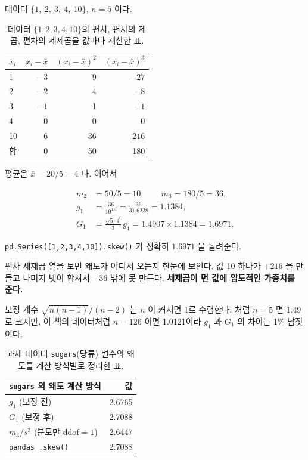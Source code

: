 \begin{example}
\label{ex:skew-by-hand}
데이터 $\{1,\ 2,\ 3,\ 4,\ 10\}$, $n = 5$ 이다.

\begin{table}[H]\centering
\caption{데이터 $\{1,2,3,4,10\}$의 편차, 편차의 제곱, 편차의 세제곱을
값마다 계산한 표.}
\label{tab:desc-skew-by-hand}
\begin{tabular}{lrrr}
\toprule
$x_i$ & $x_i - \bar{x}$ & $(x_i-\bar{x})^2$ & $(x_i-\bar{x})^3$ \\
\midrule
1  & $-3$ & 9  & $-27$ \\
\midrule
2  & $-2$ & 4  & $-8$  \\
\midrule
3  & $-1$ & 1  & $-1$  \\
\midrule
4  & $0$  & 0  & $0$   \\
\midrule
10 & $6$  & 36 & $216$ \\
\midrule
합 & $0$ & 50 & 180 \\
\bottomrule
\end{tabular}
\end{table}

평균은 $\bar{x} = 20/5 = 4$ 다. 이어서

\begin{align*}
  m_2 &= 50/5 = 10, \qquad m_3 = 180/5 = 36, \\
  g_1 &= \frac{36}{10^{1.5}} = \frac{36}{31.6228} = 1.1384, \\
  G_1 &= \frac{\sqrt{5 \cdot 4}}{3}\, g_1 = 1.4907 \times 1.1384 = 1.6971 .
\end{align*}

\texttt{pd.Series([1,2,3,4,10]).skew()} 가 정확히 $1.6971$ 을 돌려준다.

편차 세제곱 열을 보면 왜도가 어디서 오는지 한눈에 보인다. 값 10 하나가 $+216$ 을
만들고 나머지 넷이 합쳐서 $-36$ 밖에 못 만든다. \textbf{세제곱이 먼 값에 압도적인
가중치를 준다.}
\end{example}

보정 계수 $\sqrt{n(n-1)}/(n-2)$ 는 $n$ 이 커지면 1로 수렴한다. 
처럼 $n=5$ 면 1.49로 크지만, 이 책의 데이터처럼 $n=126$ 이면 1.0121이라 $g_1$ 과 $G_1$ 의
차이는 1\% 남짓이다.

\begin{table}[H]\centering
\caption{과제 데이터 \texttt{sugars}(당류) 변수의 왜도를 계산 방식별로
정리한 표.}
\label{tab:desc-sugars-skew-methods}
\begin{tabular}{lr}
\toprule
\texttt{sugars} 의 왜도 계산 방식 & 값 \\
\midrule
$g_1$ (보정 전)                                  & 2.6765 \\
\midrule
$G_1$ (보정 후)                                  & 2.7088 \\
\midrule
$m_3 / s^3$ (분모만 $\mathrm{ddof}=1$)           & 2.6447 \\
\midrule
\texttt{pandas .skew()}                          & 2.7088 \\
\bottomrule
\end{tabular}
\end{table}

